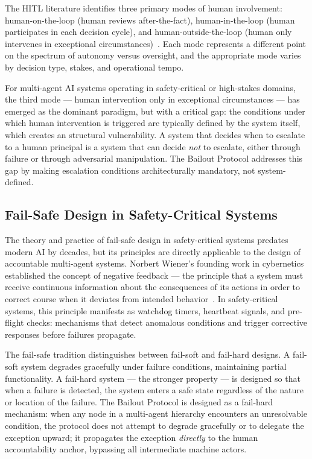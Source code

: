 The HITL literature identifies three primary modes of human involvement: human-on-the-loop (human reviews after-the-fact), human-in-the-loop (human participates in each decision cycle), and human-outside-the-loop (human only intervenes in exceptional circumstances)~\cite{bansal2019}. Each mode represents a different point on the spectrum of autonomy versus oversight, and the appropriate mode varies by decision type, stakes, and operational tempo.

For multi-agent AI systems operating in safety-critical or high-stakes domains, the third mode — human intervention only in exceptional circumstances — has emerged as the dominant paradigm, but with a critical gap: the conditions under which human intervention is triggered are typically defined by the system itself, which creates an structural vulnerability. A system that decides when to escalate to a human principal is a system that can decide \textit{not} to escalate, either through failure or through adversarial manipulation. The Bailout Protocol addresses this gap by making escalation conditions architecturally mandatory, not system-defined.

\subsection{Fail-Safe Design in Safety-Critical Systems}

The theory and practice of fail-safe design in safety-critical systems predates modern AI by decades, but its principles are directly applicable to the design of accountable multi-agent systems. Norbert Wiener's founding work in cybernetics established the concept of negative feedback — the principle that a system must receive continuous information about the consequences of its actions in order to correct course when it deviates from intended behavior~\cite{wiener1948}. In safety-critical systems, this principle manifests as watchdog timers, heartbeat signals, and pre-flight checks: mechanisms that detect anomalous conditions and trigger corrective responses before failures propagate.

The fail-safe tradition distinguishes between fail-soft and fail-hard designs. A fail-soft system degrades gracefully under failure conditions, maintaining partial functionality. A fail-hard system — the stronger property — is designed so that when a failure is detected, the system enters a safe state regardless of the nature or location of the failure. The Bailout Protocol is designed as a fail-hard mechanism: when any node in a multi-agent hierarchy encounters an unresolvable condition, the protocol does not attempt to degrade gracefully or to delegate the exception upward; it propagates the exception \textit{directly} to the human accountability anchor, bypassing all intermediate machine actors.

